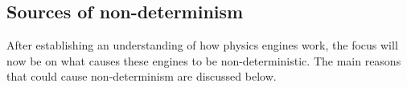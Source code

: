 


\subsection{Sources of non-determinism} \label{s:nondeterminisimSources}
\noindent After establishing an understanding of how physics engines work, the focus will now be on what causes these engines to be non-deterministic. 
The main reasons that could cause non-determinism are discussed below. \\\\

